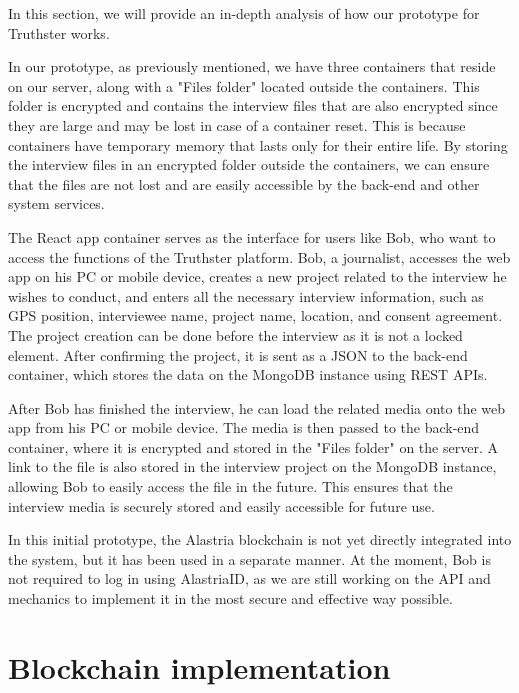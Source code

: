 \documentclass[target=mst,aauheader=]{thud}
\begin{document}
In this section, we will provide an in-depth analysis of how our prototype for Truthster works.\par
In our prototype, as previously mentioned, we have three containers that reside on our server, along with a "Files folder" located outside the containers. This folder is encrypted and contains the interview files that are also encrypted since they are large and may be lost in case of a container reset. This is because containers have temporary memory that lasts only for their entire life. By storing the interview files in an encrypted folder outside the containers, we can ensure that the files are not lost and are easily accessible by the back-end and other system services.\par
The React app container serves as the interface for users like Bob, who want to access the functions of the Truthster platform. Bob, a journalist, accesses the web app on his PC or mobile device, creates a new project related to the interview he wishes to conduct, and enters all the necessary interview information, such as GPS position, interviewee name, project name, location, and consent agreement. The project creation can be done before the interview as it is not a locked element. After confirming the project, it is sent as a JSON to the back-end container, which stores the data on the MongoDB instance using REST APIs.\par
After Bob has finished the interview, he can load the related media onto the web app from his PC or mobile device. The media is then passed to the back-end container, where it is encrypted and stored in the "Files folder" on the server. A link to the file is also stored in the interview project on the MongoDB instance, allowing Bob to easily access the file in the future. This ensures that the interview media is securely stored and easily accessible for future use.\par
In this initial prototype, the Alastria blockchain is not yet directly integrated into the system, but it has been used in a separate manner. At the moment, Bob is not required to log in using AlastriaID, as we are still working on the API and mechanics to implement it in the most secure and effective way possible.

\section{Blockchain implementation}
\end{document}

